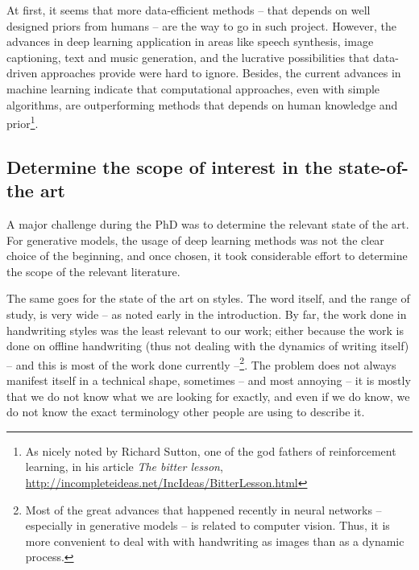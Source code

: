   \par At first, it seems that more data-efficient methods -- that depends on well designed priors from humans -- are the way to go in such project. However, the advances in deep learning application in areas like speech synthesis, image captioning, text and music generation, and the lucrative possibilities that data-driven approaches provide were hard to ignore. Besides, the current advances in machine learning indicate that computational approaches, even with simple algorithms, are outperforming methods that depends on human knowledge and prior\footnote{As nicely noted by Richard Sutton, one of the god fathers of reinforcement learning, in his article \textit{The bitter lesson}, \url{http://incompleteideas.net/IncIdeas/BitterLesson.html}}.

  \subsection{Determine the scope of interest in the state-of-the art}

    \par A major challenge during the PhD was to determine the relevant state of the art. For generative models, the usage of deep learning methods was not the clear choice of the beginning, and once chosen, it took considerable effort to determine the scope of the relevant literature.

    \par The same goes for the state of the art on styles. The word itself, and the range of study, is very wide -- as noted early in the introduction. By far, the work done in handwriting styles was the least relevant to our work; either because the work is done on offline handwriting (thus not dealing with the dynamics of writing itself) -- and this is most of the work done currently --\footnote{Most of the great advances that happened recently in neural networks -- especially in generative models -- is related to computer vision. Thus, it is more convenient to deal with with handwriting as images than as a dynamic process.}. The problem does not always manifest itself in a technical shape, sometimes -- and most annoying -- it is mostly that we do not know what we are looking for exactly, and even if we do know, we do not know the exact terminology other people are using to describe it.


